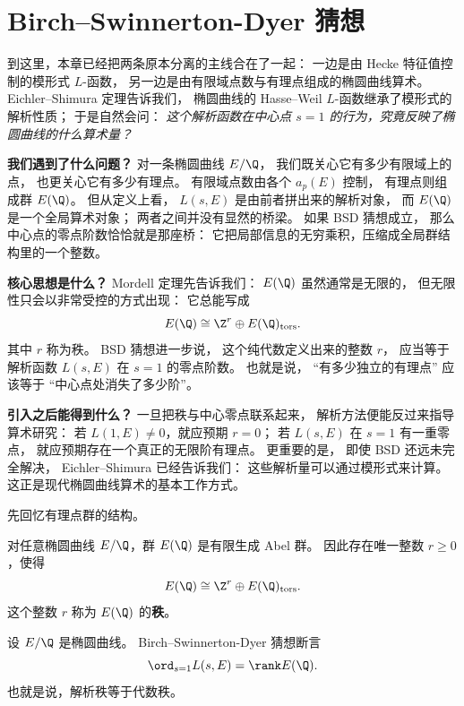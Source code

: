 \section{Birch--Swinnerton-Dyer 猜想}
\label{sec:ch08-bsd}

到这里，本章已经把两条原本分离的主线合在了一起：
一边是由 Hecke 特征值控制的模形式 $L$-函数，
另一边是由有限域点数与有理点组成的椭圆曲线算术。
Eichler--Shimura 定理告诉我们，
椭圆曲线的 Hasse--Weil $L$-函数继承了模形式的解析性质；
于是自然会问：
\emph{这个解析函数在中心点 $s=1$ 的行为，究竟反映了椭圆曲线的什么算术量？}

\textbf{我们遇到了什么问题？}
对一条椭圆曲线 $E/\Q$，
我们既关心它有多少有限域上的点，
也更关心它有多少有理点。
有限域点数由各个 $a_p(E)$ 控制，
有理点则组成群 $E(\Q)$。
但从定义上看，
$L(s,E)$ 是由前者拼出来的解析对象，
而 $E(\Q)$ 是一个全局算术对象；
两者之间并没有显然的桥梁。
如果 BSD 猜想成立，
那么中心点的零点阶数恰恰就是那座桥：
它把局部信息的无穷乘积，压缩成全局群结构里的一个整数。

\textbf{核心思想是什么？}
Mordell 定理先告诉我们：
$E(\Q)$ 虽然通常是无限的，
但无限性只会以非常受控的方式出现：
它总能写成
\[
  E(\Q)\cong \Z^r\oplus E(\Q)_{\mathrm{tors}}.
\]
其中 $r$ 称为秩。
BSD 猜想进一步说，
这个纯代数定义出来的整数 $r$，
应当等于解析函数 $L(s,E)$ 在 $s=1$ 的零点阶数。
也就是说，
“有多少独立的有理点”
应该等于
“中心点处消失了多少阶”。

\textbf{引入之后能得到什么？}
一旦把秩与中心零点联系起来，
解析方法便能反过来指导算术研究：
若 $L(1,E)\neq0$，就应预期 $r=0$；
若 $L(s,E)$ 在 $s=1$ 有一重零点，
就应预期存在一个真正的无限阶有理点。
更重要的是，
即使 BSD 还远未完全解决，
Eichler--Shimura 已经告诉我们：
这些解析量可以通过模形式来计算。
这正是现代椭圆曲线算术的基本工作方式。



先回忆有理点群的结构。

\begin{theorem}[Mordell]
\label{thm:ch08-mordell}
对任意椭圆曲线 $E/\Q$，群 $E(\Q)$ 是有限生成 Abel 群。
因此存在唯一整数 $r\ge0$，使得
\[
  E(\Q)\cong \Z^r\oplus E(\Q)_{\mathrm{tors}}.
\]
这个整数 $r$ 称为 $E(\Q)$ 的\textbf{秩}。
\end{theorem}

\begin{definition}[BSD 猜想]
\label{def:ch08-bsd}
设 $E/\Q$ 是椭圆曲线。
Birch--Swinnerton-Dyer 猜想断言
\[
  \ord_{s=1}L(s,E)=\rank E(\Q).
\]
也就是说，解析秩等于代数秩。
\end{definition}

